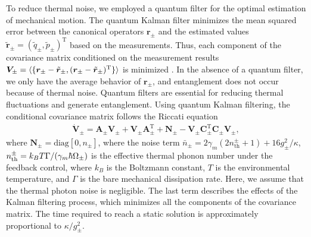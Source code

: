 \documentclass[twocolumn,superscriptaddress,aps,preprintnumbers,amsmath,amssymb,prl,nofootinbib]{revtex4}
\begin{document}
To reduce thermal noise, we employed a quantum filter for the optimal estimation of mechanical motion.
The quantum Kalman filter minimizes the mean squared error
between the canonical operators $\bm{r}_\pm$ and the estimated values $\tilde{\bm{r}}_\pm=(\tilde{q}_\pm,\tilde{p}_\pm)^{\text{T}}$ based on the measurements.
Thus, each component of the covariance matrix conditioned on the measurement results $\bm{V}_\pm=\braket{\{\bm{r}_\pm-\tilde{\bm{r}}_\pm,(\bm{r}_\pm-\tilde{\bm{r}}_\pm)^{\text{T}}\}}$ is minimized \cite{Yamamoto,Wieczorek}.
In the absence of a quantum filter, we only have the average behavior of $\bm{r}_\pm$, and entanglement does not occur because of thermal noise.
Quantum filters are essential for 
reducing thermal fluctuations and 
generate entanglement.
Using quantum Kalman filtering, the conditional covariance matrix follows the Riccati equation
\begin{eqnarray}
\dot{\bm{V}}_\pm=
\bm{A}_\pm\bm{V}_\pm
+\bm{V}_\pm\bm{A}_\pm^{\text{T}}+\bm{N}_\pm-\bm{V}_\pm\bm{C}_\pm^{\text{T}}\bm{C}_\pm\bm{V}_\pm,
\label{eq:Riccati}
\end{eqnarray}
where
$\bm{N}_\pm=\text{diag}[0,n_\pm]$, where the noise term $\bar{n}_\pm=
2\gamma_m(2n_{\text{th}}^\pm+1)+{ 16 g _\pm^2}/{\kappa}$, 
$n_{\rm th}^\pm=k_BT\Gamma/(\gamma_m\hbar\Omega_\pm)$ is the effective thermal phonon number under the feedback control, where 
$k_B$ is the Boltzmann constant, $T$ is the environmental temperature, and $\Gamma$ is the bare mechanical dissipation rate.
Here, we assume that the thermal photon noise is negligible.
The last term describes the effects of the Kalman filtering process, which minimizes all the components of the covariance matrix.
The time required to reach a static solution is approximately proportional to $\kappa/g_\pm^2$.
\end{document}
